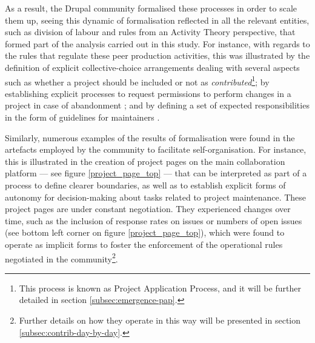 As a result, the Drupal community formalised these processes in order to scale them up, seeing this dynamic of formalisation reflected in all the relevant entities, such as division of labour and rules from an Activity Theory perspective, that formed part of the analysis carried out in this study. For instance, with regards to the rules that regulate these peer production activities, this was illustrated by the definition of explicit collective-choice arrangements dealing with several aspects such as whether a project should be included or not as \textit{contributed}\footnote{This process is known as Project Application Process, and it will be further detailed in section \ref{subsec:emergence-pap}.}; by establishing explicit processes to request permissions to perform changes in a project in case of abandonment \parencite{maintenance-abadonment:Online}; and by defining a set of expected responsibilities in the form of guidelines for maintainers \parencite{maintenance-guidelines:Online}.

Similarly, numerous examples of the results of formalisation were found in the artefacts employed by the community to facilitate self-organisation. For instance, this is illustrated in the creation of project pages on the main collaboration platform --- see figure \ref{project_page_top} --- that can be interpreted as part of a process to define clearer boundaries, as well as to establish explicit forms of autonomy for decision-making about tasks related to project maintenance. These project pages are under constant negotiation. They experienced changes over time, such as the inclusion of response rates on issues or numbers of open issues (see bottom left corner on figure \ref{project_page_top}), which were found to operate as implicit forms to foster the enforcement of the operational rules negotiated in the community\footnote{Further details on how they operate in this way will be presented in section \ref{subsec:contrib-day-by-day}.}.

